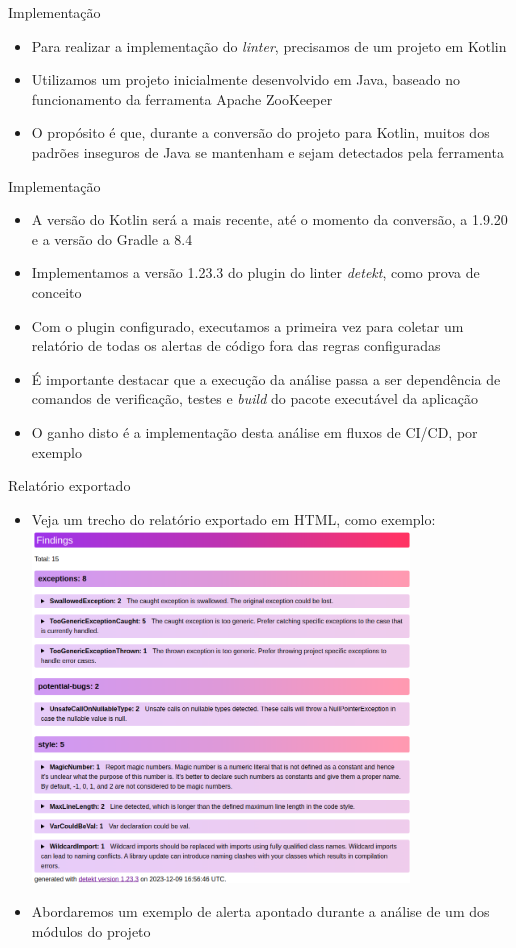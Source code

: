 \documentclass[brazilian]{beamer}
\begin{document}
\begin{frame}{Implementação}
    \begin{itemize}
        \item Para realizar a implementação do \textit{linter}, precisamos de um projeto em Kotlin
        \item Utilizamos um projeto inicialmente desenvolvido em Java, baseado no funcionamento da ferramenta Apache ZooKeeper
        \item O propósito é que, durante a conversão do projeto para Kotlin, muitos dos padrões inseguros de Java se mantenham e sejam detectados pela ferramenta
    \end{itemize}
\end{frame}

\begin{frame}{Implementação}
    \begin{itemize}
        \item A versão do Kotlin será a mais recente, até o momento da conversão, a 1.9.20 e a versão do Gradle a 8.4
        \item Implementamos a versão 1.23.3 do plugin do linter \emph{detekt}, como prova de conceito
        \item Com o plugin configurado, executamos a primeira vez para coletar um relatório de todas os alertas de código fora das regras configuradas
        \item É importante destacar que a execução da análise passa a ser dependência de comandos de verificação, testes e \textit{build} do pacote executável da aplicação
        \item O ganho disto é a implementação desta análise em fluxos de CI/CD, por exemplo
    \end{itemize}
\end{frame}

\begin{frame}{Relatório exportado}
    \begin{itemize}
        \item Veja um trecho do relatório exportado em HTML, como exemplo:
        \centering
        \includegraphics[width=10cm]{report_findings}
        \item Abordaremos um exemplo de alerta apontado durante a análise de um dos módulos do projeto
    \end{itemize}
\end{frame}
\end{document}
